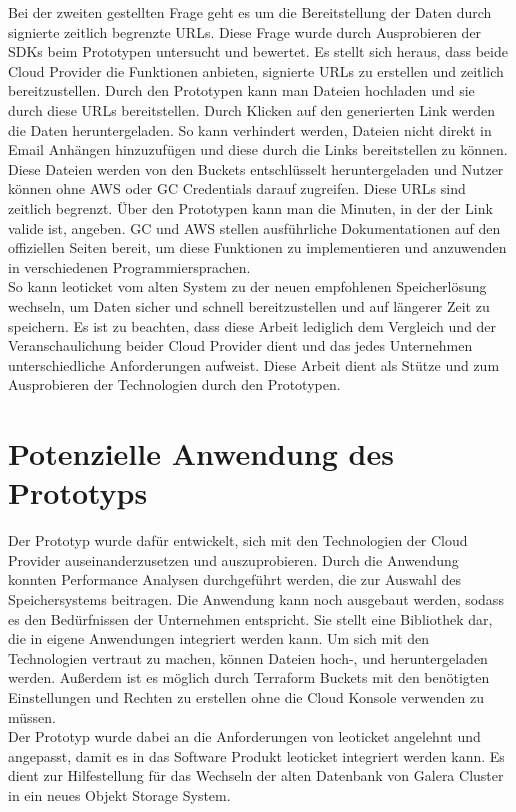 Bei der zweiten gestellten Frage geht es um die Bereitstellung der Daten durch signierte zeitlich begrenzte URLs. Diese Frage wurde durch Ausprobieren der SDKs beim Prototypen untersucht und bewertet. Es stellt sich heraus, dass beide Cloud Provider die Funktionen anbieten, signierte URLs zu erstellen und zeitlich bereitzustellen. Durch den Prototypen kann man Dateien hochladen und sie durch diese URLs bereitstellen. Durch Klicken auf den generierten Link werden die Daten heruntergeladen. So kann verhindert werden, Dateien nicht direkt in Email Anhängen hinzuzufügen und diese durch die Links bereitstellen zu können. Diese Dateien werden von den Buckets entschlüsselt heruntergeladen und Nutzer können ohne AWS oder GC Credentials darauf zugreifen. Diese URLs sind zeitlich begrenzt. Über den Prototypen kann man die Minuten, in der der Link valide ist, angeben. GC und AWS stellen ausführliche Dokumentationen auf den offiziellen Seiten bereit, um diese Funktionen zu implementieren und anzuwenden in verschiedenen Programmiersprachen.\\

So kann leoticket vom alten System zu der neuen empfohlenen Speicherlösung wechseln, um Daten sicher und schnell bereitzustellen und auf längerer Zeit zu speichern. Es ist zu beachten, dass diese Arbeit lediglich dem Vergleich und der Veranschaulichung beider Cloud Provider dient und das jedes Unternehmen unterschiedliche Anforderungen aufweist. Diese Arbeit dient als Stütze und zum Ausprobieren der Technologien durch den Prototypen. 

\newpage

\section{Potenzielle Anwendung des Prototyps}

Der Prototyp wurde dafür entwickelt, sich mit den Technologien der Cloud Provider auseinanderzusetzen und auszuprobieren. Durch die Anwendung konnten Performance Analysen durchgeführt werden, die zur Auswahl des Speichersystems beitragen. Die Anwendung kann noch ausgebaut werden, sodass es den Bedürfnissen der Unternehmen entspricht. Sie stellt eine Bibliothek dar, die in eigene Anwendungen integriert werden kann. Um sich mit den Technologien vertraut zu machen, können Dateien hoch-, und heruntergeladen werden. Außerdem ist es möglich durch Terraform Buckets mit den benötigten Einstellungen und Rechten zu erstellen ohne die Cloud Konsole verwenden zu müssen.\\

Der Prototyp wurde dabei an die Anforderungen von leoticket angelehnt und angepasst, damit es in das Software Produkt leoticket integriert werden kann. Es dient zur Hilfestellung für das Wechseln der alten Datenbank von Galera Cluster in ein neues Objekt Storage System. 
